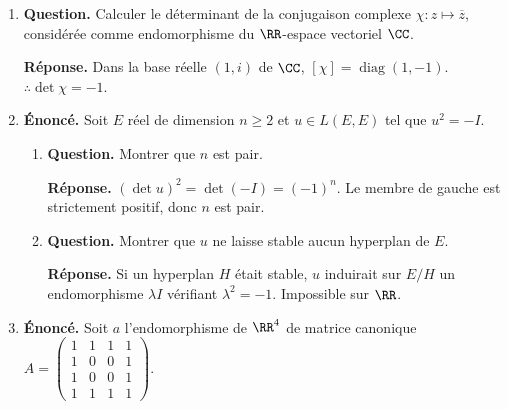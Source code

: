 \documentclass[12pt, a4paper]{article}
\begin{document}
\begin{enumerate}[label=7.\arabic*., start=68]
\begin{minipage}[t]{\linewidth}
\begin{enumerate}[\arabic*.]
  \item \textbf{Question.} Dans $K[X]$, examiner $f:P\mapsto P^{\prime}$ et $g:P\mapsto XP$.
\par\smallskip
\textbf{Réponse.} Sur $K[X]$, $f(g(P))-g(f(P))=(XP)'-XP'=P$.
        C'est bien un exemple en dimension infinie.

\end{enumerate}
\end{minipage}

  \item \begin{minipage}[t]{\linewidth}\raggedright
\textbf{Question.} Calculer le déterminant de la conjugaison complexe $\chi:z\mapsto\overline z$, considérée comme endomorphisme du $\RR$-espace vectoriel $\CC$.
\par\smallskip
\textbf{Réponse.} Dans la base réelle $(1,i)$ de $\CC$, $[\chi]=\operatorname{diag}(1,-1)$.
    $\therefore\det\chi=-1$.
\end{minipage}

  \item \begin{minipage}[t]{\linewidth}\raggedright
\textbf{Énoncé.} Soit $E$ réel de dimension $n\geq2$ et $u\in L(E,E)$ tel que $u^2=-I$.

\begin{enumerate}[\arabic*.]
        \item \textbf{Question.} Montrer que $n$ est pair.
\par\smallskip
\textbf{Réponse.} $(\det u)^2=\det(-I)=(-1)^n$.
        Le membre de gauche est strictement positif, donc $n$ est pair.

  \item \textbf{Question.} Montrer que $u$ ne laisse stable aucun hyperplan de $E$.
\par\smallskip
\textbf{Réponse.} Si un hyperplan $H$ était stable, $u$ induirait sur $E/H$ un endomorphisme $\lambda I$ vérifiant $\lambda^2=-1$.
        Impossible sur $\RR$.

\end{enumerate}
\end{minipage}

  \item \begin{minipage}[t]{\linewidth}\raggedright
\textbf{Énoncé.} Soit $a$ l’endomorphisme de $\RR^4$ de matrice canonique $\displaystyle A=\begin{pmatrix}1&1&1&1\\1&0&0&1\\1&0&0&1\\1&1&1&1\end{pmatrix}$.


\end{minipage}
\end{enumerate}
\end{document}
